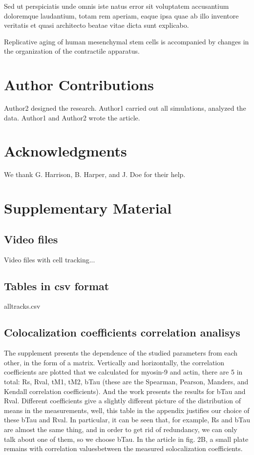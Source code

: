 \documentclass[english,authoryear]{elsarticle}
\begin{document}
Sed ut perspiciatis unde omnis iste natus error sit voluptatem accusantium doloremque laudantium, totam rem aperiam, eaque ipsa quae ab illo inventore veritatis et quasi architecto beatae vitae dicta sunt explicabo.

Replicative aging of human mesenchymal stem cells is accompanied by changes in the organization of the contractile apparatus.

\section*{Author Contributions}

Author2 designed the research. Author1 carried out all simulations, analyzed the data. Author1 and Author2 wrote the article.

\section*{Acknowledgments}

We thank G. Harrison, B. Harper, and J. Doe for their help.

%
%
%


\section*{Supplementary Material}

\subsection*{Video files}

Video files with cell tracking...

\subsection*{Tables in csv format}

alltracks.csv

\subsection*{Colocalization coefficients correlation analisys}

The supplement presents the dependence of the studied parameters from each other, in the form of a matrix.
Vertically and horizontally, the correlation coefficients are plotted that we calculated for myosin-9 and actin, there are 5 in total: Rs, Rval, tM1, tM2, bTau (these are the Spearman, Pearson, Manders, and Kendall correlation coefficients). And the work presents the results for bTau and Rval. Different coefficients give a slightly different picture of the distribution of means in the measurements, well, this table in the appendix justifies our choice of these bTau and Rval. In particular, it can be seen that, for example, Rs and bTau are almost the same thing, and in order to get rid of redundancy, we can only talk about one of them, so we choose bTau. In the article in fig. 2B, a small plate remains with correlation values ​​between the measured solocalization coefficients.
\end{document}
